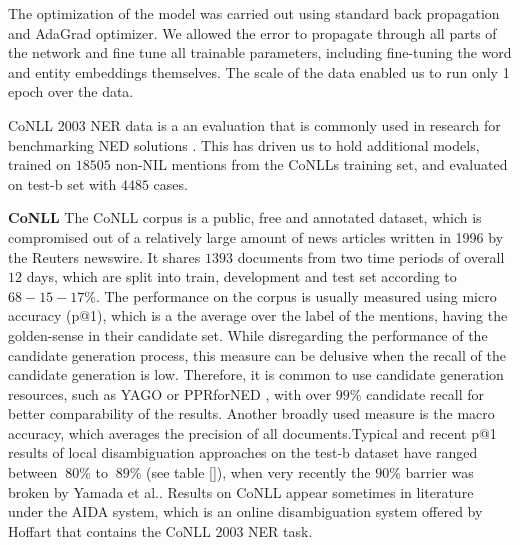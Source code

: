 \documentclass[11pt]{article}
\begin{document}
	The optimization of the model was carried out using standard back propagation and AdaGrad optimizer\cite{duchi2011adaptive}. We allowed the error to propagate through all parts of the network and fine tune all trainable parameters, including fine-tuning the word and entity embeddings themselves. The scale of the data enabled us to run only 1 epoch over the data.
    
    CoNLL 2003 NER data is a an evaluation that is commonly used in research for benchmarking NED solutions \cite{Globerson2016,Hachey2013,Yamada2016,Pershina2015}. This has driven us to hold additional models, trained on $18505$ non-NIL mentions from the CoNLLs training set, and evaluated on test-b set with $4485$ cases. 

	{\bf CoNLL}
	The CoNLL corpus is a public, free and annotated dataset, which is compromised out of a relatively large amount of news articles written in 1996 by the Reuters newswire. It shares $1393$ documents from two time periods of overall $12$ days, which are split into train, development and test set according to $68-15-17$\%. The performance on the corpus is usually measured using micro accuracy (p@1), which is a the average over the label of the mentions, having the golden-sense in their candidate set. While disregarding the performance of the candidate generation process, this measure can be delusive when the recall of the candidate generation is low. Therefore, it is common to use candidate generation resources, such as YAGO \cite{hoffart2011robust} or PPRforNED \cite{Pershina2015}, with over $99$\% candidate recall for better comparability of the results. Another broadly used measure is the macro accuracy, which averages the precision of all documents.Typical and recent p@1 results of local disambiguation approaches on the test-b dataset have ranged between $~80$\% to $~89$\% (see table \ref{}), when very recently the $90$\% barrier was broken by Yamada et al.\cite{Yamada2016}. Results on CoNLL appear sometimes in literature under the AIDA system, which is an online disambiguation system offered by Hoffart that contains the CoNLL 2003 NER task.
	
\end{document}
